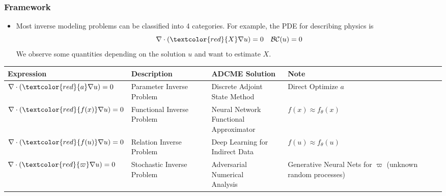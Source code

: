 \documentclass{beamer}
\begin{document}
\begin{frame}
	\frametitle{Framework}
\begin{itemize}
	\item Most inverse modeling problems can be classified into 4 categories. For example, the PDE for describing physics is
	\begin{equation}
		\nabla \cdot (\textcolor{red}{X} \nabla u) = 0\quad \mathcal{B}\mathcal{C}(u) = 0
	\end{equation}
	We observe some quantities depending on the solution $u$ and want to estimate $X$.
\end{itemize}
{
\tiny
\begin{table}[]
\begin{tabular}{@{}llll@{}}
\toprule
Expression                                       & Description                & ADCME Solution                         & Note                                     \\ \midrule
$\nabla \cdot (\textcolor{red}{a} \nabla u) = 0$ & Parameter Inverse Problem  & \makecell{Discrete Adjoint\\ State Method}          & Direct Optimize $a$                      \\ \hline
$\nabla \cdot (\textcolor{red}{f(x)} \nabla u) = 0$ & Functional Inverse Problem & \makecell{Neural Network \\ Functional Approximator} & $f(x) \approx f_{\theta}(x)$             \\ \hline
$\nabla \cdot (\textcolor{red}{f(u)} \nabla u) = 0$ & Relation Inverse Problem   & \makecell{Deep Learning for\\ Indirect Data}        & $f(u) \approx f_{\theta}(u)$             \\ \hline
$\nabla \cdot (\textcolor{red}{\varpi} \nabla u) = 0$ & Stochastic Inverse Problem & \makecell{Adversarial Numerical\\ Analysis}         & \makecell{Generative Neural Nets for $\varpi$\\ (unknown random processes)} \\ \bottomrule
\end{tabular}
\end{table}
}
\end{frame}
\end{document}
